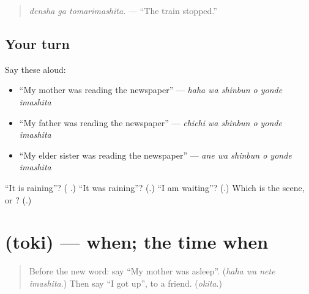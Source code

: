 \begin{quote}
\textbf{ }
\end{quote}

\begin{quote}
\emph{densha ga tomarimashita.} — \textquotedblleft{}The train stopped.\textquotedblright{}
\end{quote}

\subsection*{Your turn}
Say these aloud:

\begin{itemize}
\raggedright
  \item \textquotedblleft{}My mother was reading the newspaper\textquotedblright{} — \emph{haha wa shinbun o yonde imashita}
  \item \textquotedblleft{}My father was reading the newspaper\textquotedblright{} — \emph{chichi wa shinbun o yonde imashita}
  \item \textquotedblleft{}My elder sister was reading the newspaper\textquotedblright{} — \emph{ane wa shinbun o yonde imashita}
\end{itemize}

\begin{tcolorbox}[breakable,colback=teal!4,colframe=teal!35!black,title={Before you move on}]
\textquotedblleft{}It is raining\textquotedblright{}? (\textbf{ }.) \textquotedblleft{}It was raining\textquotedblright{}? (\textbf{}.) \textquotedblleft{}I am waiting\textquotedblright{}? (\textbf{}.) Which is the scene, \textbf{} or \textbf{}? (\textbf{}.)
\end{tcolorbox}
\section[\texorpdfstring{\ja{とき} (toki)}{とき (toki)}]{ (toki) — when; the time when}

\label{lesson:JA-C253-toki}



\begin{quote}
Before the new word: say \textquotedblleft{}My mother was asleep\textquotedblright{}. (\emph{haha wa nete imashita}.) Then say \textquotedblleft{}I got up\textquotedblright{}, to a friend. (\emph{okita}.)
\end{quote}

